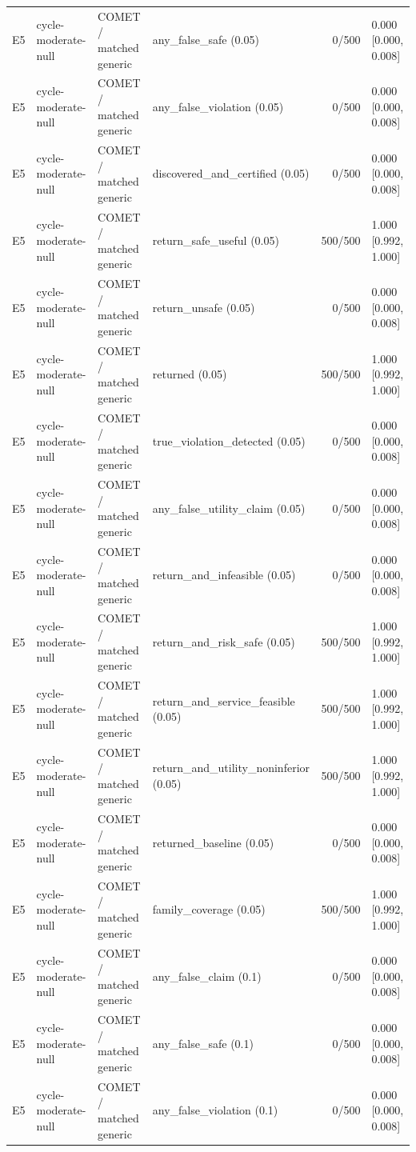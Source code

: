 \begin{longtable}{p{.04\linewidth}p{.18\linewidth}p{.19\linewidth}p{.16\linewidth}r p{.21\linewidth}}
E5 & cycle-moderate-null & COMET / matched generic & any\_false\_safe (0.05) & 0/500 & 0.000 [0.000, 0.008]\\
E5 & cycle-moderate-null & COMET / matched generic & any\_false\_violation (0.05) & 0/500 & 0.000 [0.000, 0.008]\\
E5 & cycle-moderate-null & COMET / matched generic & discovered\_and\_certified (0.05) & 0/500 & 0.000 [0.000, 0.008]\\
E5 & cycle-moderate-null & COMET / matched generic & return\_safe\_useful (0.05) & 500/500 & 1.000 [0.992, 1.000]\\
E5 & cycle-moderate-null & COMET / matched generic & return\_unsafe (0.05) & 0/500 & 0.000 [0.000, 0.008]\\
E5 & cycle-moderate-null & COMET / matched generic & returned (0.05) & 500/500 & 1.000 [0.992, 1.000]\\
E5 & cycle-moderate-null & COMET / matched generic & true\_violation\_detected (0.05) & 0/500 & 0.000 [0.000, 0.008]\\
E5 & cycle-moderate-null & COMET / matched generic & any\_false\_utility\_claim (0.05) & 0/500 & 0.000 [0.000, 0.008]\\
E5 & cycle-moderate-null & COMET / matched generic & return\_and\_infeasible (0.05) & 0/500 & 0.000 [0.000, 0.008]\\
E5 & cycle-moderate-null & COMET / matched generic & return\_and\_risk\_safe (0.05) & 500/500 & 1.000 [0.992, 1.000]\\
E5 & cycle-moderate-null & COMET / matched generic & return\_and\_service\_feasible (0.05) & 500/500 & 1.000 [0.992, 1.000]\\
E5 & cycle-moderate-null & COMET / matched generic & return\_and\_utility\_noninferior (0.05) & 500/500 & 1.000 [0.992, 1.000]\\
E5 & cycle-moderate-null & COMET / matched generic & returned\_baseline (0.05) & 0/500 & 0.000 [0.000, 0.008]\\
E5 & cycle-moderate-null & COMET / matched generic & family\_coverage (0.05) & 500/500 & 1.000 [0.992, 1.000]\\
E5 & cycle-moderate-null & COMET / matched generic & any\_false\_claim (0.1) & 0/500 & 0.000 [0.000, 0.008]\\
E5 & cycle-moderate-null & COMET / matched generic & any\_false\_safe (0.1) & 0/500 & 0.000 [0.000, 0.008]\\
E5 & cycle-moderate-null & COMET / matched generic & any\_false\_violation (0.1) & 0/500 & 0.000 [0.000, 0.008]\\

\end{longtable}
